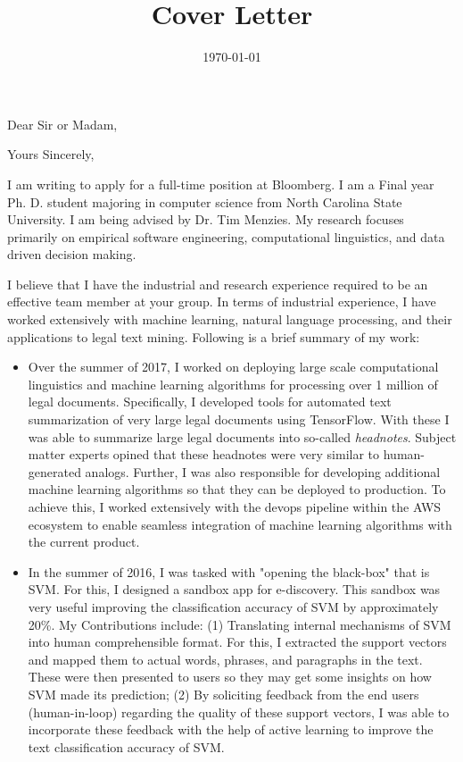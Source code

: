 \documentclass[11pt,letterpaper,sans]{moderncv}         \moderncvstyle{casual}
\title{Cover Letter}
\begin{document}
\date{\today}
\opening{Dear Sir or Madam,}
\closing{Yours Sincerely,}

\makelettertitle

I am writing to apply for a full-time position at Bloomberg. I am a Final year 
Ph. D. student majoring in computer science from North Carolina State 
University. I am being advised by Dr. Tim Menzies. My research focuses 
primarily on empirical software engineering, computational linguistics, and 
data driven decision making.

I believe that I have the industrial and research experience required to be an 
effective team member at your group. In terms of industrial experience, I have 
worked extensively with machine learning, natural language processing, and 
their applications to legal text mining. Following is a brief summary of my 
work:\\[0.33cm]
\begin{itemize}
	\item Over the summer of 2017, I worked on 
deploying large scale computational linguistics and 
machine learning algorithms for processing over 1 million of legal documents. 
Specifically, I developed tools for automated text summarization of very large 
legal documents using TensorFlow. With these I was able to summarize large 
legal documents into so-called \textit{headnotes}. Subject matter experts 
opined that 
these headnotes were very similar to human-generated analogs. Further, I was 
also responsible for developing additional machine learning algorithms so that 
they can be deployed to production. To achieve this, I worked extensively with 
the devops pipeline within the AWS ecosystem to enable seamless integration of 
machine learning algorithms with the current product.\\[0.1cm]
 \item In the summer of 2016, I was tasked with "opening the black-box" that is 
 SVM. For this, I designed a sandbox app for e-discovery. This sandbox was very 
 useful improving the classification accuracy of SVM by approximately 20\%. My 
 Contributions include: 
 (1) Translating internal mechanisms of SVM into human comprehensible format. 
 For this, I extracted the support vectors and mapped them to actual words, 
 phrases, and paragraphs in the text. These were then presented to users so 
 they may get some insights on how SVM made its prediction; 
 (2) By soliciting feedback from the end users (human-in-loop) regarding the 
 quality of these support vectors, I was able to incorporate these feedback 
 with the help of active learning to improve the text classification accuracy 
 of SVM.
 
\end{itemize}
\end{document}
